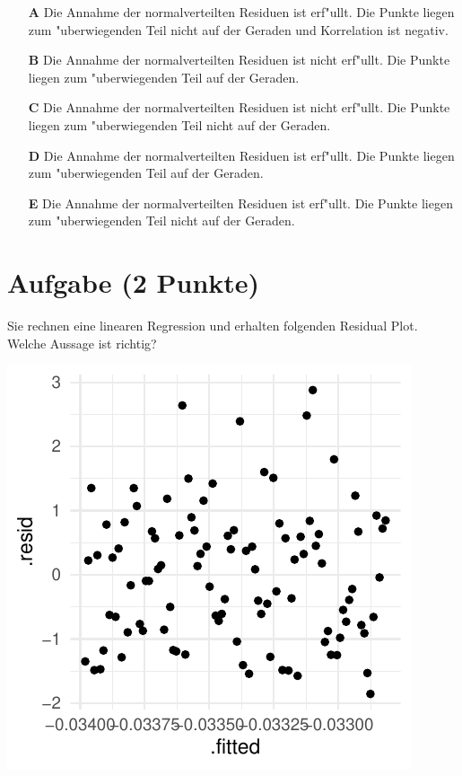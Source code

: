 \documentclass[a4paper, 9pt]{scrartcl}\usepackage[]{graphicx}\usepackage[]{xcolor}
\makeatletter
\def\maxwidth{ %
  \ifdim\Gin@nat@width>\linewidth
    \linewidth
  \else
    \Gin@nat@width
  \fi
}
\makeatother
\begin{document}
\begin{enumerate}
\item [\textbf{A} \msquare] Die Annahme der normalverteilten Residuen ist erf{"u}llt. Die Punkte liegen zum {"u}berwiegenden Teil nicht auf der Geraden und Korrelation ist negativ.
\item [\textbf{B} \msquare] Die Annahme der normalverteilten Residuen ist nicht erf{"u}llt. Die Punkte liegen zum {"u}berwiegenden Teil auf der Geraden.
\item [\textbf{C} \msquare] Die Annahme der normalverteilten Residuen ist nicht erf{"u}llt. Die Punkte liegen zum {"u}berwiegenden Teil nicht auf der Geraden.
\item [\textbf{D} \msquare] Die Annahme der normalverteilten Residuen ist erf{"u}llt. Die Punkte liegen zum {"u}berwiegenden Teil auf der Geraden.
\item [\textbf{E} \msquare] Die Annahme der normalverteilten Residuen ist erf{"u}llt. Die Punkte liegen zum {"u}berwiegenden Teil nicht auf der Geraden.
\end{enumerate}

\section{Aufgabe \hfill (2 Punkte)}

Sie rechnen eine linearen Regression und erhalten folgenden Residual
Plot. Welche Aussage ist richtig?




{\centering \includegraphics[width=\maxwidth]{img/mc-regression-06-a-1} 

}
\end{document}
